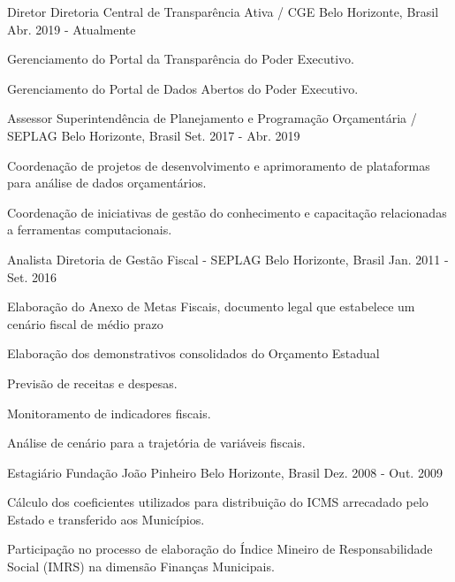 \begin{cventries}
    \cventry
    {Diretor}
    {Diretoria Central de Transparência Ativa / CGE}
    {Belo Horizonte, Brasil}
    {Abr. 2019 - Atualmente}
    {
      \begin{cvitems}
        \item {Gerenciamento do Portal da Transparência do Poder Executivo.}
        \item {Gerenciamento do Portal de Dados Abertos do Poder Executivo.}
      \end{cvitems}
    }

    \cventry
    {Assessor}
    {Superintendência de Planejamento e Programação Orçamentária / SEPLAG}
    {Belo Horizonte, Brasil}
    {Set. 2017 - Abr. 2019}
    {
      \begin{cvitems}
        \item {Coordenação de projetos de desenvolvimento e aprimoramento de plataformas para análise de dados orçamentários.}
        \item {Coordenação de iniciativas de gestão do conhecimento e capacitação relacionadas a ferramentas computacionais.}
      \end{cvitems}
    }
    \cventry
    {Analista}
    {Diretoria de Gestão Fiscal - SEPLAG}
    {Belo Horizonte, Brasil}
    {Jan. 2011 - Set. 2016}
    {
      \begin{cvitems}
        \item {Elaboração do Anexo de Metas Fiscais, documento legal que estabelece um cenário fiscal de médio prazo}
        \item {Elaboração dos demonstrativos consolidados do Orçamento Estadual}
        \item {Previsão de receitas e despesas.}
        \item {Monitoramento de indicadores fiscais.}
        \item {Análise de cenário para a trajetória de variáveis fiscais.}
      \end{cvitems}
    }
    \cventry
    {Estagiário}
    {Fundação João Pinheiro}
    {Belo Horizonte, Brasil}
    {Dez. 2008 - Out. 2009}
    {
      \begin{cvitems}
        \item {Cálculo dos coeficientes utilizados para distribuição do ICMS arrecadado pelo Estado e transferido aos Municípios.}
        \item {Participação no processo de elaboração do Índice Mineiro de Responsabilidade Social (IMRS) na dimensão Finanças Municipais.}
      \end{cvitems}
    }  
\end{cventries}
